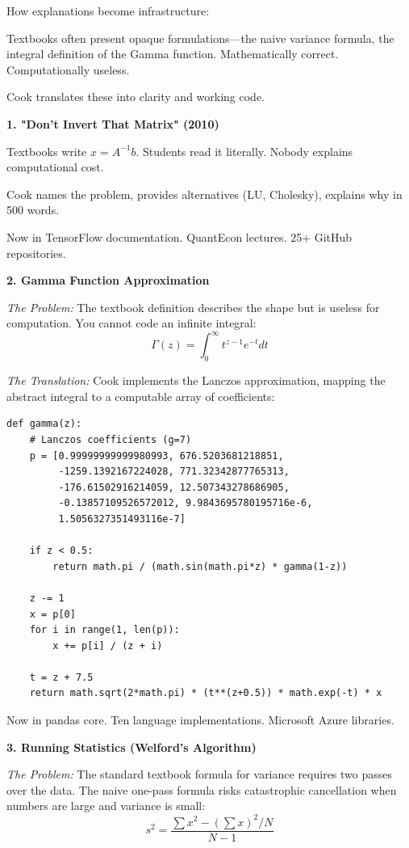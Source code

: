 How explanations become infrastructure:

Textbooks often present opaque formulations---the naive variance formula, the integral definition of the Gamma function. Mathematically correct. Computationally useless.

Cook translates these into clarity and working code.

\textbf{1. "Don't Invert That Matrix" (2010)}

Textbooks write $x = A^{-1}b$. Students read it literally. Nobody explains computational cost.

Cook names the problem, provides alternatives (LU, Cholesky), explains why in 500 words.

Now in TensorFlow documentation. QuantEcon lectures. 25+ GitHub repositories.

\textbf{2. Gamma Function Approximation}

\textit{The Problem:} The textbook definition describes the shape but is useless for computation. You cannot code an infinite integral:
$$\Gamma(z) = \int_0^\infty t^{z-1} e^{-t} dt$$

\textit{The Translation:} Cook implements the Lanczos approximation, mapping the abstract integral to a computable array of coefficients:

\begin{lstlisting}[style=python]
def gamma(z):
    # Lanczos coefficients (g=7)
    p = [0.99999999999980993, 676.5203681218851,
         -1259.1392167224028, 771.32342877765313,
         -176.61502916214059, 12.507343278686905,
         -0.13857109526572012, 9.9843695780195716e-6,
         1.5056327351493116e-7]

    if z < 0.5:
        return math.pi / (math.sin(math.pi*z) * gamma(1-z))

    z -= 1
    x = p[0]
    for i in range(1, len(p)):
        x += p[i] / (z + i)

    t = z + 7.5
    return math.sqrt(2*math.pi) * (t**(z+0.5)) * math.exp(-t) * x
\end{lstlisting}

Now in pandas core. Ten language implementations. Microsoft Azure libraries.

\textbf{3. Running Statistics (Welford's Algorithm)}

\textit{The Problem:} The standard textbook formula for variance requires two passes over the data. The naive one-pass formula risks catastrophic cancellation when numbers are large and variance is small:
$$s^2 = \frac{\sum x^2 - (\sum x)^2/N}{N-1}$$


